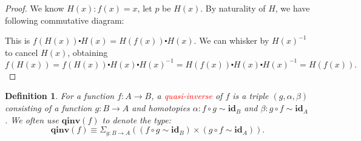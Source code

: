\documentclass{article}
\newtheorem{definition}[theorem]{Definition}
\newcommand{\redt}[1]{\textcolor{red}{#1}}
\newcommand{\id}{\textbf{id}}
\newcommand{\qinv}{\textbf{qinv}}
\begin{document}
\begin{proof}
\rm We know $H(x) : f(x) = x$, let $p$ be $H(x)$. By naturality of $H$, we have following commutative diagram:
\begin{center}
\end{center}
This is $f(H(x)) \centerdot H(x) = H(f(x)) \centerdot H(x)$. We can whisker by ${H(x)}^{-1}$ to cancel $H(x)$, obtaining
\[
    f(H(x)) = f(H(x)) \centerdot H(x) \centerdot {H(x)}^{-1} = H(f(x)) \centerdot H(x) \centerdot {H(x)}^{-1} = H(f(x)).
\]
\end{proof}


\begin{definition}
\rm For a function $f : A \to B$, a \redt{quasi-inverse} of $f$ is a triple $(g, \alpha,\beta)$ consisting of a function $g : B \to A$ and homotopies $\alpha : f \circ g \sim \id_B$ and $\beta : g \circ f \sim \id_A$. We often use $\qinv(f)$ to denote the type:
\[
    \qinv(f) \equiv \Sigma_{g : B \to A}((f \circ g \sim \id_B) \times (g \circ f \sim \id_A)).
\]
\end{definition}
\end{document}
